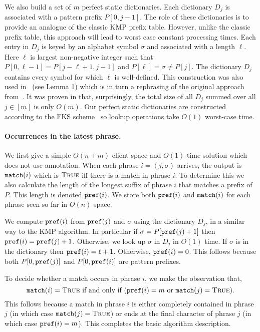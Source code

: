 We also build a set of $m$ perfect static dictionaries. Each dictionary $D_j$ is associated with a pattern prefix $P[0,j-1]$. The role of these dictionaries is to provide an analogue of the classic KMP prefix table. However, unlike the classic prefix table, this approach will lead to worst case constant processing times. Each entry in $D_j$ is keyed by an alphabet symbol $\sigma$ and associated with a length $\ell$. Here $\ell$ is largest non-negative integer such that $P[0, \ell-1] = P[j-\ell+1,j-1]$ and $P[\ell]=\sigma \neq P[j]$. The dictionary $D_j$ contains every symbol for which $\ell$ is well-defined. This construction was also used in~\cite{clifford2012pattern} (see Lemma 1) which is in turn a rephrasing of the original approach from~\cite{simon1994string}. It was proven in \cite{simon1994string} that, surprisingly, the total size of all $D_j$ summed over all $j \in [m]$ is only $O(m)$. Our perfect static dictionaries are constructed according to the FKS scheme~\cite{fredman1984storing} so lookup operations take $O(1)$ worst-case time.


\paragraph{Occurrences in the latest phrase.} We first give a simple $O(n+m)$ client space and $O(1)$ time solution which does not use annotation. When each phrase $i=(j,\sigma)$ arrives, the output is $\mathtt{match}(i)$ which is $\textsc{True}$ iff there is a match in phrase $i$. To determine this we also calculate the length of the longest suffix of phrase $i$ that matches a prefix of $P$. This length is denoted $\mathtt{pref}(i)$. We store both $\mathtt{pref}(i)$ and $\mathtt{match}(i)$ for each phrase seen so far in $O(n)$ space.

We compute $\mathtt{pref}(i)$ from $\mathtt{pref}(j)$ and $\sigma$ using the dictionary $D_j$, in a similar way to the KMP algorithm. In particular if $\sigma=P[\mathtt{pref}(j)+1]$ then $\mathtt{pref}(i)=\mathtt{pref}(j)+1$. Otherwise, we look up $\sigma$ in $D_j$ in $O(1)$ time. If $\sigma$ is in the dictionary then $\mathtt{pref}(i)=\ell+1$. Otherwise, $\mathtt{pref}(i)=0$. This follows because both $P[0, \mathtt{pref}(j)]$ and $P[0, \mathtt{pref}(i)]$ are pattern prefixes.

To decide whether a match occurs in phrase $i$, we make the observation that, \[ \mathtt{match}(i)=\textsc{True} \text{ if and only if }  (\mathtt{pref}(i)=m \text{ or } \mathtt{match}(j)=\textsc{True}). \] This follows because a match in phrase $i$ is either completely contained in phrase $j$ (in which case $\mathtt{match}(j)=\textsc{True}$) or ends at the final character of phrase $j$ (in which case $\mathtt{pref}(i)=m$). This completes the basic algorithm description.

